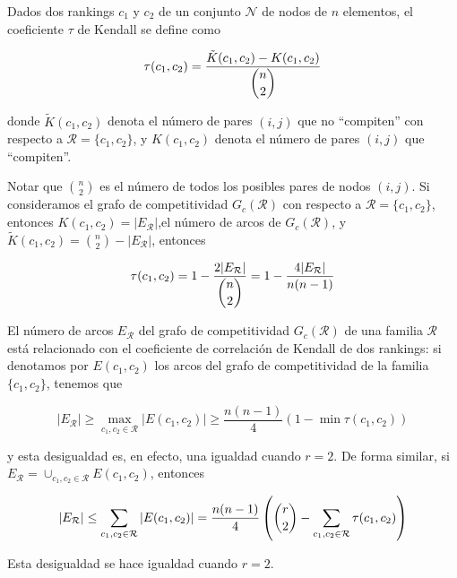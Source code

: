 \begin{defi}
Dados dos rankings $c_1$ y $c_2$ de un conjunto $\mathcal{N}$ de nodos de $n$ elementos, el coeficiente $\tau$ de Kendall se define como

\[ \tau(c_1, c_2) = \dfrac{\tilde{K}(c_1, c_2) - K(c_1, c_2)}{\dbinom{n}{2}} \]

donde $\tilde{K}(c_1, c_2)$ denota el número de pares $(i,j)$ que no ``compiten'' con respecto a $\mathcal{R} = \{c_1, c_2\}$, y $K(c_1, c_2)$ denota el número de pares $(i,j)$ que ``compiten''.
\end{defi}

\begin{nota}
Notar que $\binom{n}{2}$ es el número de todos los posibles pares de nodos $(i,j)$. Si consideramos el grafo de competitividad $G_c(\mathcal{R})$ con respecto a $\mathcal{R} = \{c_1, c_2\}$, entonces $K(c_1, c_2) = |E_\mathcal{R}|$,el número de arcos de $G_c(\mathcal{R})$, y $\tilde{K}(c_1, c_2) = \binom{n}{2} - |E_\mathcal{R}|$, entonces

\[ \tau(c_1,c_2) = 1 - \dfrac{2 |E_\mathcal{R}|}{\dbinom{n}{2}} = 1- \dfrac{4 |E_\mathcal{R}|}{n(n-1)} \]

El número de arcos $E_\mathcal{R}$ del grafo de competitividad $G_c(\mathcal{R})$ de una familia $\mathcal{R}$ está relacionado con el coeficiente de correlación de Kendall de dos rankings: si denotamos por $E(c_1, c_2)$ los arcos del grafo de competitividad de la familia $\{c_1, c_2\}$, tenemos que

\[ |E_\mathcal{R}| \geq \max_{c_1, c_2 \in \mathcal{R}} |E(c_1, c_2)| \geq \dfrac{n(n-1)}{4}(1 - \min \tau(c_1, c_2)) \]

y esta desigualdad es, en efecto, una igualdad cuando $r=2$. De forma similar, si $E_\mathcal{R} = \cup_{c_1, c_2 \in \mathcal{R}} E(c_1, c_2)$, entonces

\[ |E_\mathcal{R}| \leq \sum_{c_1, c_2 \in \mathcal{R}} |E(c_1, c_2)| = \dfrac{n(n-1)}{4} \left( \dbinom{r}{2} - \sum_{c_1, c_2 \in \mathcal{R}} \tau(c_1, c_2) \right) \]

Esta desigualdad se hace igualdad cuando $r=2$.
\end{nota}

